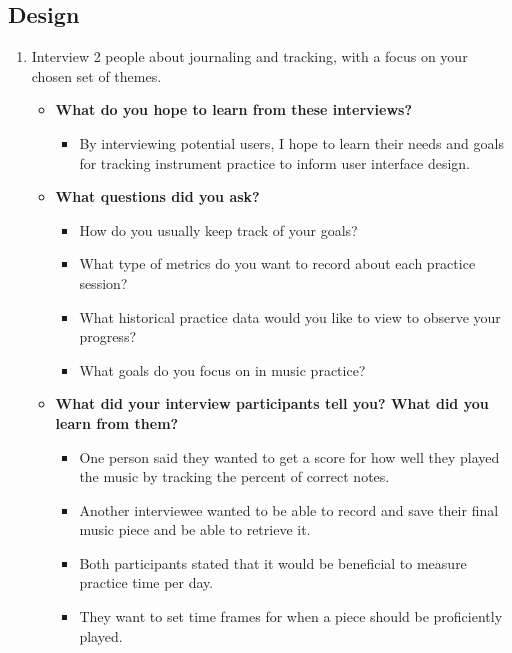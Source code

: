 \documentclass{article}
\begin{document}
\subsection*{Design}
\begin{enumerate}
    \item Interview 2 people about journaling and tracking, with a focus on your chosen set of themes.
    \begin{itemize}
        \item \textbf{What do you hope to learn from these interviews?}
        \begin{itemize}
            \item By interviewing potential users, I hope to learn their needs and goals for tracking instrument practice to inform user interface design.
        \end{itemize}
        
        \item \textbf{What questions did you ask?}
        \begin{itemize}
            \item How do you usually keep track of your goals?
            \item What type of metrics do you want to record about each practice session?
            \item What historical practice data would you like to view to observe your progress?
            \item What goals do you focus on in music practice?
        \end{itemize}
        
        \item \textbf{What did your interview participants tell you? What did you learn from them?}
        \begin{itemize}
            \item One person said they wanted to get a score for how well they played the music by tracking the percent of correct notes.
            \item Another interviewee wanted to be able to record and save their final music piece and be able to retrieve it.
            \item Both participants stated that it would be beneficial to measure practice time per day.
            \item They want to set time frames for when a piece should be proficiently played.
        \end{itemize}
    \end{itemize}
\end{enumerate}
\end{document}
